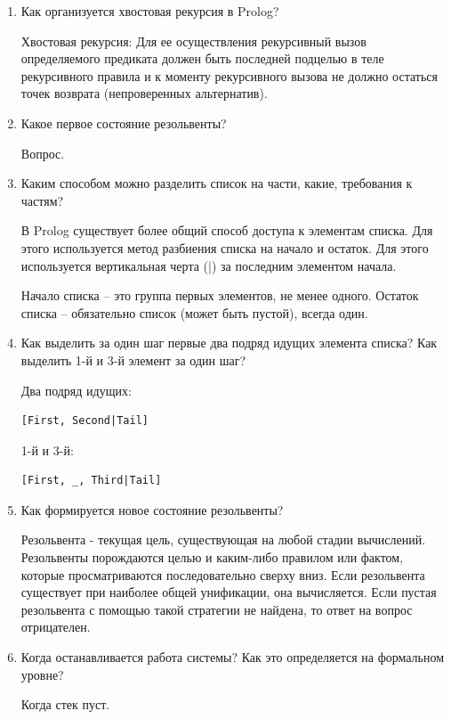 \documentclass[a4paper,14pt]{extreport} %
\begin{document}
\begin{enumerate} 
\item Как организуется хвостовая рекурсия в Prolog? 

Хвостовая рекурсия: Для ее осуществления рекурсивный вызов определяемого предиката должен быть последней подцелью в теле рекурсивного правила и к моменту рекурсивного вызова не должно остаться точек возврата (непроверенных альтернатив). 

\item Какое первое состояние резольвенты?

Вопрос. 

\item Каким способом можно разделить список на части, какие, требования к частям?

В Prolog существует более общий способ доступа к элементам списка. Для этого используется метод разбиения списка на начало и остаток. Для этого используется вертикальная черта (|) за последним элементом начала. 

Начало списка -- это группа первых элементов, не менее одного. Остаток списка -- обязательно список (может быть пустой), всегда один. 

\item Как выделить за один шаг первые два подряд идущих элемента списка? Как выделить 1-й и 3-й элемент за один шаг?

Два подряд идущих:

\begin{lstlisting}
[First, Second|Tail]
\end{lstlisting}

1-й и 3-й:

\begin{lstlisting}
[First, _, Third|Tail]
\end{lstlisting}

\item Как формируется новое состояние резольвенты?

Резольвента - текущая цель, существующая на любой стадии вычислений. Резольвенты порождаются целью и каким-либо правилом или фактом, которые просматриваются последовательно сверху вниз. Если резольвента существует при наиболее общей унификации, она вычисляется. Если пустая резольвента с помощью такой стратегии не найдена, то ответ на вопрос отрицателен.

\item Когда останавливается работа системы? Как это определяется на формальном уровне?

Когда стек пуст. 

\end{enumerate}
 
\end{document}

